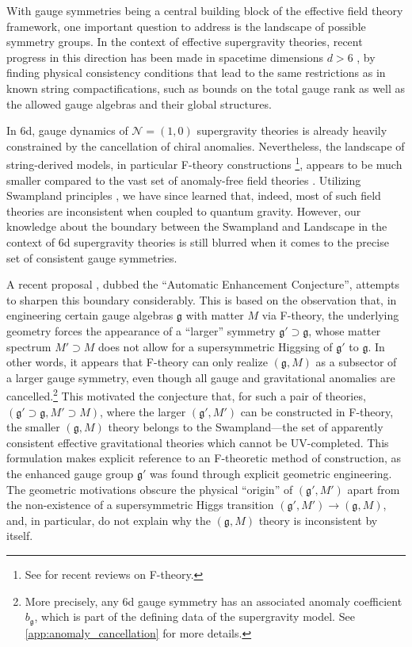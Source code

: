 \documentclass[11pt, a4paper]{article}
\newcommand*{\cN}{\ensuremath{\mathcal{N}}}
\newcommand*{\fkg}{\ensuremath{\mathfrak{g}}}
\begin{document}
With gauge symmetries being a central building block of the effective field theory framework, one important question to address is the landscape of possible symmetry groups.
In the context of effective supergravity theories, recent progress in this direction has been made in spacetime dimensions $d>6$ \cite{Adams:2010zy,Garcia-Etxebarria:2017crf,Kim:2019vuc,Cvetic:2020kuw,Montero:2020icj,Hamada:2021bbz}, by finding physical consistency conditions that lead to the same restrictions as in known string compactifications, such as bounds on the total gauge rank as well as the allowed gauge algebras and their global structures.


In 6d, gauge dynamics of $\cN = (1, 0)$ supergravity theories is already heavily constrained by the cancellation of chiral anomalies.
Nevertheless, the landscape of string-derived models, in particular F-theory constructions \cite{Vafa:1996xn,Morrison:1996na,Morrison:1996pp}\footnote{See \cite{Weigand:2018rez,Cvetic:2018bni} for recent reviews on F-theory.}, appears to be much smaller compared to the vast set of anomaly-free field theories \cite{Kumar:2009us,Kumar:2009ae,Kumar:2010ru}.
Utilizing Swampland principles \cite{Seiberg:2011dr,Monnier:2017oqd,Monnier:2018nfs,Kim:2019vuc,Lee:2019skh,Angelantonj:2020pyr,Apruzzi:2020zot,Tarazi:2021duw,Cheng:2021zjh}, we have since learned that, indeed, most of such field theories are inconsistent when coupled to quantum gravity.
However, our knowledge about the boundary between the Swampland and Landscape in the context of 6d supergravity theories is still blurred when it comes to the precise set of consistent gauge symmetries.


A recent proposal \cite{Raghuram:2020vxm}, dubbed the ``Automatic Enhancement Conjecture'', attempts to sharpen this boundary considerably.
This is based on the observation that, in engineering certain gauge algebras $\fkg$ with matter $M$ via F-theory, the underlying geometry forces the appearance of a ``larger'' symmetry $\fkg' \supset \fkg$, whose matter spectrum $M' \supset M$ does not allow for a supersymmetric Higgsing of $\fkg'$ to $\fkg$.
In other words, it appears that F-theory can only realize $(\fkg,M)$ as a subsector of a larger gauge symmetry, even though all gauge and gravitational anomalies are cancelled.\footnote{More precisely, any 6d gauge symmetry has an associated anomaly coefficient $b_\fkg$, which is part of the defining data of the supergravity model. See \cref{app:anomaly_cancellation} for more details.}
This motivated the conjecture \cite{Raghuram:2020vxm} that, for such a pair of theories, $(\fkg' \supset \fkg, M' \supset M)$, where the larger $(\fkg',M')$ can be constructed in F-theory, the smaller $(\fkg,M)$ theory belongs to the Swampland---the set of apparently consistent effective gravitational theories which cannot be UV-completed.
This formulation makes explicit reference to an F-theoretic method of construction, as the enhanced gauge group $\fkg'$ was found through explicit geometric engineering.
The geometric motivations obscure the physical ``origin'' of $(\fkg',M')$ apart from the non-existence of a supersymmetric Higgs transition $(\fkg', M') \rightarrow (\fkg, M)$, and, in particular, do not explain why the $(\fkg, M)$ theory is inconsistent by itself.
\end{document}

